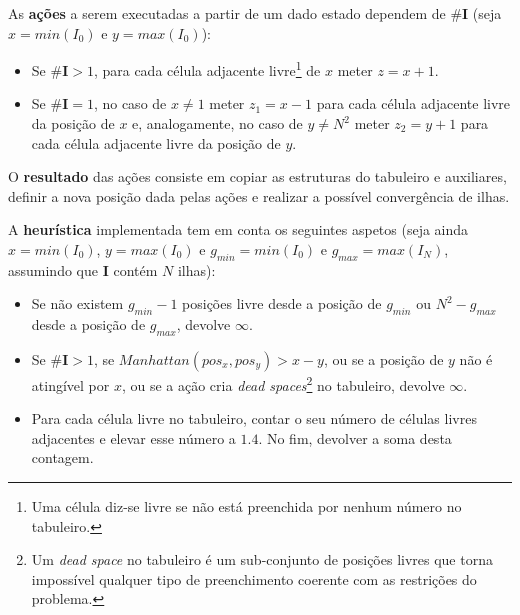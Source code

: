 \documentclass[12pt]{exam}
\begin{document}
        \vspace{-3.5mm}
        \indent As \textbf{ações} a serem executadas a partir de um dado estado dependem de \#\textbf{I} (seja $x = min(I_{0})$ e $y = max(I_{0})$):\\
        \vspace{-6.5mm}
        \begin{itemize}[label=]
          \setlength\itemsep{-0.2em}
            \item Se $\#\textbf{I} > 1$, para cada célula adjacente livre\footnote{Uma célula diz-se livre se não está preenchida por nenhum número no tabuleiro.} de $x$ meter $z = x + 1$.
            \item Se $\#\textbf{I} = 1$, no caso de $x \neq 1$ meter $z_{1} = x - 1$ para cada célula adjacente livre da posição de $x$ e, analogamente, no caso de $y \neq N^2$ meter $z_{2} = y + 1$ para cada célula adjacente livre da posição de $y$.
        \end{itemize}
        \vspace{-3mm}

        \indent O \textbf{resultado} das ações consiste em copiar as estruturas do tabuleiro e auxiliares, definir a nova posição dada pelas ações e realizar a possível convergência de ilhas.

        \indent A \textbf{heurística} implementada tem em conta os seguintes aspetos (seja ainda $x = min(I_{0})$, $y = max(I_{0})$ e $g_{min} = min(I_{0})$ e $g_{max} = max(I_{N})$, assumindo que \textbf{I} contém $N$ ilhas):
        \vspace{-2mm}
        \begin{itemize}[label=]
          \setlength\itemsep{-0.2em}
            \item Se não existem $g_{min} - 1$ posições livre desde a posição de $g_{min}$ ou $N^2 - g_{max}$ desde a posição de $g_{max}$, devolve $\infty$.
            \item Se $\#\textbf{I} > 1$, se $Manhattan(pos_{x}, pos_{y}) > x - y$, ou se a posição de $y$ não é atingível por $x$, ou se a ação cria \textit{dead spaces}\footnote{Um \textit{dead space} no tabuleiro é um sub-conjunto de posições livres que torna impossível qualquer tipo de preenchimento coerente com as restrições do problema.} no tabuleiro, devolve $\infty$.
            \item Para cada célula livre no tabuleiro, contar o seu número de células livres adjacentes e elevar esse número a $1.4$. No fim, devolver a soma desta contagem.
        \end{itemize}
\end{document}

